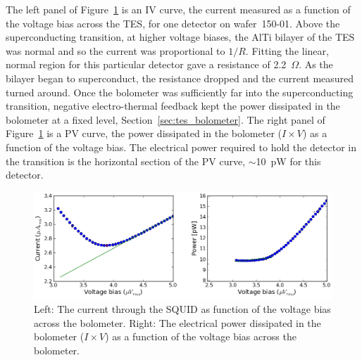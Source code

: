 The left panel of Figure~\ref{fig:bolo_iv_curve} is an IV curve, the current measured as a function of the voltage bias across the \ac{TES}, for one detector on wafer~150-01.
Above the superconducting transition, at higher voltage biases, the AlTi bilayer of the \ac{TES} was normal and so the current was proportional to $1/R$. 
Fitting the linear, normal region for this particular detector gave a resistance of 2.2~$\Omega$.
As the bilayer began to superconduct, the resistance dropped and the current measured turned around. %
Once the bolometer was sufficiently far into the superconducting transition, negative electro-thermal feedback kept the power dissipated in the bolometer at a fixed level, Section~\ref{sec:tes_bolometer}.
The right panel of Figure~\ref{fig:bolo_iv_curve} is a PV curve, the power dissipated in the bolometer ($I \times V$) as a function of the voltage bias. 
The electrical power required to hold the detector in the transition is the horizontal section of the PV curve, $\sim$10~pW for this detector.

\begin{figure}[htbp]
\begin{center}
\includegraphics[width=0.99\columnwidth]{figures/b53w0c0_IV.png} 
\caption{Left: The current through the \ac{SQUID} as function of the voltage bias across the bolometer. Right: The electrical power dissipated in the bolometer ($I \times V$) as a function of the voltage bias across the bolometer.
\label{fig:bolo_iv_curve} }
\end{center}
\end{figure}





